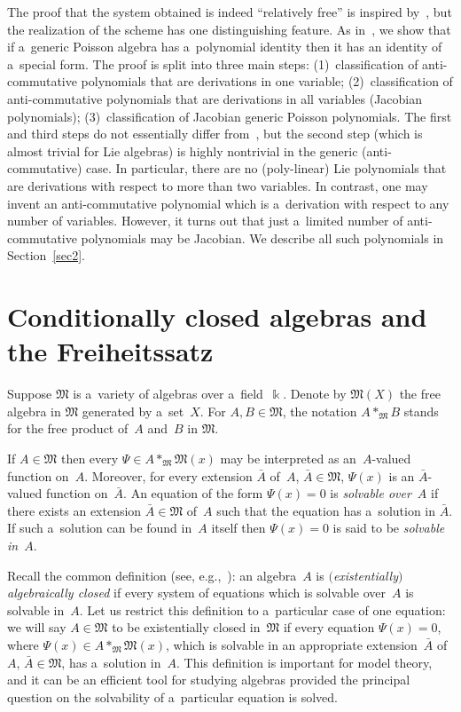 The proof that the system obtained is indeed ``relatively free'' is inspired by~\cite{FarkasI}, but the reali\-za\-tion of
the scheme has one distinguishing feature.
As in~\cite{FarkasI}, we show that if a~generic Poisson algebra has a~polynomial identity then it has an identity of
a~special form.
The proof is split into three main steps: (1)~classif\/ication of anti-commutative polynomials that are derivations in one
variable; (2)~classif\/ication of anti-commutative polynomials that are derivations in all variables (Jacobian
polynomials); (3)~classif\/ication of Jacobian generic Poisson polynomials.
The f\/irst and third steps do not essentially dif\/fer from~\cite{FarkasI}, but the second step (which is almost trivial
for Lie algebras) is highly nontrivial in the generic (anti-commutative) case.
In particular, there are no (poly-linear) Lie polynomials that are derivations with respect to more than two variables.
In contrast, one may invent an anti-commutative polynomial which is a~derivation with respect to any number of
variables.
However, it turns out that just a~limited number of anti-commutative polynomials may be Jacobian.
We describe all such polynomials in Section~\ref{sec2}.

\section{Conditionally closed algebras and the Freiheitssatz}\label{sec1}

Suppose $\mathfrak M$ is a~variety of algebras over a~f\/ield~$\Bbbk $.
Denote by $\mathfrak M(X)$ the free algebra in $\mathfrak M$ generated by a~set~$X$.
For $A,B\in \mathfrak M$, the notation $A*_{\mathfrak M} B$ stands for the free product of~$A$ and~$B$ in $\mathfrak M$.

If $A\in \mathfrak M$ then every $\Psi \in A*_{\mathfrak M} \mathfrak M(x)$ may be interpreted as an~$A$-valued
function on~$A$.
Moreover, for every extension $\bar A$ of~$A$, $\bar A\in \mathfrak M$, $\Psi(x)$ is an $\bar A$-valued function
on~$\bar A$.
An equation of the form $\Psi(x)=0$ is {\em solvable over}~$A$ if there exists an extension $\bar A\in \mathfrak M$
of~$A$ such that the equation has a~solution in $\bar A$.
If such a~solution can be found in~$A$ itself then $\Psi(x)=0$ is said to be {\em solvable in}~$A$.

Recall the common def\/inition (see, e.g.,~\cite{Higman, Scott}): an algebra~$A$ is {\em $($existentially$)$ algebraically
closed\/} if every system of equations which is solvable over~$A$ is solvable in~$A$.
Let us restrict this def\/inition to a~particular case of one equation: we will say $A\in \mathfrak M$ to be existentially
closed in~$\mathfrak M$ if every equation $\Psi(x)=0$, where $\Psi(x)\in A*_{\mathfrak M} \mathfrak M(x)$, which is solvable in an
appropriate extension~$\bar A$ of~$A$, $\bar A\in \mathfrak M$, has a~solution in~$A$.
This def\/inition is important for model theory, and it can be an ef\/f\/icient tool for studying algebras provided the
principal question on the solvability of a~particular equation is solved.

